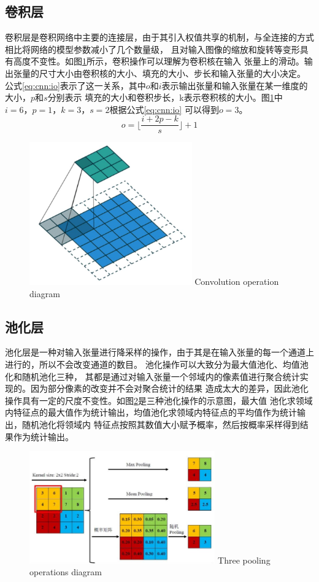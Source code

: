 \subsection{卷积层}
	卷积层是卷积网络中主要的连接层，由于其引入权值共享的机制，与全连接的方式相比将网络的模型参数减小了几个数量级，
	且对输入图像的缩放和旋转等变形具有高度不变性。如图\ref{fig:chap4:cnn-op}所示，卷积操作可以理解为卷积核在输入
	张量上的滑动。输出张量的尺寸大小由卷积核的大小、填充的大小、步长和输入张量的大小决定。
	公式\ref{eq:cnn:io}表示了这一关系，其中$o$和$i$表示输出张量和输入张量在某一维度的大小，$p$和$s$分别表示
	填充的大小和卷积步长，k表示卷积核的大小。图\ref{fig:chap4:cnn-op}中$i=6，p=1，k=3，s=2$根据公式\ref{eq:cnn:io}
	可以得到$o=3$。
	\begin{equation}
		o = \lfloor \frac{i+2p-k}{s} \rfloor +1 \label{eq:cnn:io}
	\end{equation}
	
	\begin{figure}[h]
	  \centering
	  \includegraphics[width=7cm]{figure/chap4/CNN-op.jpg}
		{Convolution operation diagram}
	  \label{fig:chap4:cnn-op}
	\end{figure}
\subsection{池化层}
	池化层是一种对输入张量进行降采样的操作，由于其是在输入张量的每一个通道上进行的，所以不会改变通道的数目。
	池化操作可以大致分为最大值池化、均值池化和随机池化三种，
	其都是通过对输入张量一个邻域内的像素值进行聚合统计实现的。因为部分像素的改变并不会对聚合统计的结果
	造成太大的差异，因此池化操作具有一定的尺度不变性。如图\ref{fig:pooling}是三种池化操作的示意图，最大值
	池化求领域内特征点的最大值作为统计输出，均值池化求领域内特征点的平均值作为统计输出，随机池化将领域内
	特征点按照其数值大小赋予概率，然后按概率采样得到结果作为统计输出。
	\begin{figure}[h]
	  \centering
	  \includegraphics[width=8cm]{figure/chap4/pooling.jpg}
		{Three pooling operations diagram}
	  \label{fig:pooling}
	\end{figure}
